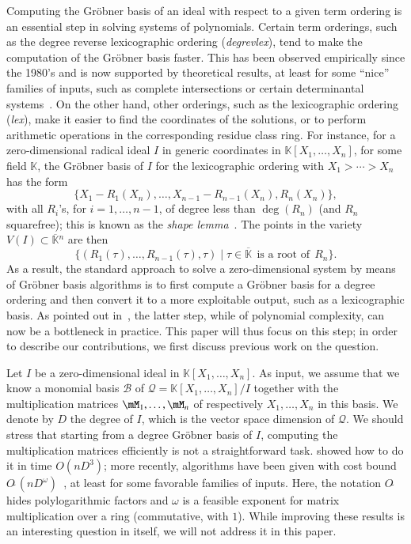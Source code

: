 \documentclass[final,1p,times,authoryear]{elsarticle}
\newcommand{\basis}{\mathscr{B}}
\newcommand{\softO}[1]{O{\tilde{~}}(#1)} %
\newcommand{\residueI}{\mathscr{Q}}
\def\K{\mathbb{K}}
\def\K {\ensuremath{\mathbb{K}}}
\def\Kbar {{\ensuremath{\overline{\mathbb{K}}}}}
\begin{document}
Computing the Gr\"obner basis of an ideal with respect to a given term
ordering is an essential step in solving systems of polynomials.
Certain term orderings, such as the degree reverse lexicographic
ordering (\textit{degrevlex}), tend to make the computation of the
Gr\"obner basis faster. This has been observed empirically since the
1980's and is now supported by theoretical results, at least for some
``nice'' families of inputs, such as complete intersections or certain
determinantal systems~\citep{Faugere02,FaSaSp13,BaFaSa15}.  On the
other hand, other orderings, such as the lexicographic ordering
(\textit{lex}), make it easier to find the coordinates of the
solutions, or to perform arithmetic operations in the corresponding
residue class ring.  For instance, for a zero-dimensional radical
ideal $I$ in generic coordinates in $\K[X_1,\dots,X_n]$, for some
field $\K$, the Gr\"obner basis of $I$ for the lexicographic ordering
with $X_1 > \cdots > X_n$ has the form
\begin{equation}\label{eq:shapelemma}
  \{ X_1 - R_1(X_n),\dots,X_{n-1}-R_{n-1}(X_n),R_n(X_n)\},
\end{equation}
with all $R_i$'s, for $i =1,\dots,n-1$, of degree less than
$\deg(R_n)$ (and $R_n$ squarefree); this is known as the {\em
shape lemma}~\citep{GiMo89}. The points in the variety $V(I) \subset
\Kbar{}^n$ are then
$$\{ ( R_1(\tau), \dots, R_{n-1}(\tau), \tau ) \mid \tau \in \Kbar
\;\,\text{is a root of}\;\, R_n\}.$$ As a result, the standard approach to
solve a zero-dimensional system by means of Gr\"obner basis
algorithms is to first compute a Gr\"obner basis for a degree ordering
and then convert it to a more exploitable output, such as a lexicographic
basis. As pointed out in~\citep{FaMo17}, the latter step, while of
polynomial complexity, can now be a bottleneck in practice. This
paper will thus focus on this step; in order to describe our 
contributions, we first discuss previous work on the question.

Let $I$ be a zero-dimensional ideal in $\K[X_1,\dots,X_n]$. As
input, we assume that we know a monomial basis $\basis$ of
$\residueI=\K[X_1,\dots,X_n]/I$ together with the multiplication
matrices $\mM_1,\dots,\mM_n$ of respectively $X_1,\dots,X_n$ in this
basis. We denote by $D$ the degree of $I$, which is the vector space
dimension of $\residueI$. We should stress that starting from a
degree Gr\"obner basis of $I$, computing the multiplication matrices
efficiently is not a straightforward task. \citep{FaGiLaMo93}
showed how to do it in time $O(nD^3)$; more
recently, algorithms have been given with cost bound
$\softO{nD^\omega}$~\citep{FaGaHuRe13,FaGaHuRe14,Neiger16}, at least
for some favorable families of inputs. Here, the notation
$O\tilde{~}$ hides polylogarithmic factors and $\omega$ is a feasible
exponent for matrix multiplication over a ring (commutative, with
$1$). While improving these results is an interesting question in
itself, we will not address it in this paper.
\end{document}
